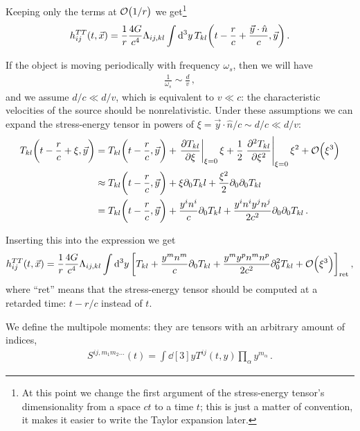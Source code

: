 \documentclass[main.tex]{subfiles}
\begin{document}
Keeping only the terms at \(\order{1/r}\) we get\footnote{At this point we change the first argument of the stress-energy tensor's dimensionality from a space \(ct\) to a time \(t\); this is just a matter of convention, it makes it easier to write the Taylor expansion later. }
%
\begin{align}
h_{ij}^{TT} (t, \vec{x}) = \frac{1}{r} \frac{4G}{c^{4}}
\Lambda_{ij, kl} \int \dd[3]{y} 
T_{kl} \qty(t - \frac{r}{c} + \frac{\vec{y} \cdot \hat{n}}{c}, \vec{y})
\,.
\end{align}

If the object is moving periodically with frequency \(\omega_s \), then we will have 
%
\begin{align}
\frac{1}{\omega_s } \sim \frac{d}{v}
\,,
\end{align}
%
and we assume \(d/c \ll d/v\), which is equivalent to \(v \ll c\): the characteristic velocities of the source should be nonrelativistic. 
Under these assumptions we can expand the stress-energy tensor in powers of \(\xi = \vec{y} \cdot \hat{n} / c \sim d/c \ll d/v\): 
%
\begin{align}
T_{kl} \qty(t - \frac{r}{c} + \xi, \vec{y}) &= T_{kl} \qty(t - \frac{r}{c}, \vec{y}) + \eval{\pdv{T_{kl}}{\xi }}_{\xi = 0} \xi  + \frac{1}{2} \eval{\pdv[2]{T_{kl}}{\xi }}_{\xi = 0} \xi^2 + \order{\xi^3}  \\
&\approx T_{kl} \qty(t - \frac{r}{c}, \vec{y}) + 
\xi \partial_0 T_kl + \frac{\xi^2}{2} \partial_{0} \partial_0 T_{kl}  \\
&= T_{kl} \qty(t - \frac{r}{c}, \vec{y}) + 
\frac{y^{i}n^{i}}{c} \partial_0 T_kl + \frac{y^{i}n^{i}y^{j}n^{j}}{2 c^2} \partial_{0} \partial_0 T_{kl}
\,.
\end{align}

Inserting this into the expression we get
%
\begin{align}
h_{ij}^{TT} (t, \vec{x}) = \frac{1}{r} \frac{4G}{c^{4}} \Lambda_{ij, kl} \int \dd[3]{y}\qty[T_{kl} + \frac{y^{m} n^{m}}{c} \partial_0 T_{kl}  + \frac{y^{m} y^{p} n^{m} n^{p}}{2c^2} \partial_0^2 T_{kl} + \order{\xi^3}]_{\text{ret}}
\,,
\end{align}
%
where ``ret'' means that the stress-energy tensor should be computed at a retarded time: \(t - r/c\) instead of \(t\).

We define the multipole moments: they are tensors with an arbitrary amount of indices,
%
\begin{align}
S^{ij, m_1 m_2 \dots} (t) = \int \dd[3]{y} T^{ij}(t, y) \prod_\alpha  y^{m_\alpha }
\,.
\end{align}
\end{document}
